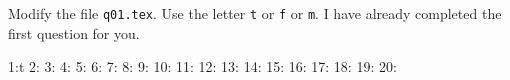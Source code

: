 
Modify the file \verb!q01.tex!.
Use the letter \verb!t! or \verb!f! or \verb!m!.
I have already completed the first question for you.

\begin{console}
1:t
2:
3:
4:
5:
6:
7:
8:
9:
10:
11:
12:
13:
14:
15:
16:
17:
18:
19:
20:
\end{console}
